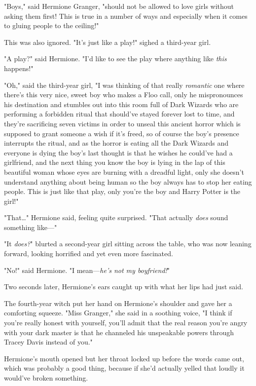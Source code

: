 "Boys," said Hermione Granger, "should not be allowed to love girls without
asking them first! This is true in a number of ways and especially when it
comes to gluing people to the ceiling!"

This was also ignored. "It's just like a play!" sighed a third-year girl.

"A play?" said Hermione. "I'd like to see the play where anything like
\emph{this} happens!"

"Oh," said the third-year girl, "I was thinking of that really \emph{romantic}
one where there's this very nice, sweet boy who makes a Floo call, only he
mispronounces his destination and stumbles out into this room full of Dark
Wizards who are performing a forbidden ritual that should've stayed forever
lost to time, and they're sacrificing seven victims in order to unseal this
ancient horror which is supposed to grant someone a wish if it's freed, so of
course the boy's presence interrupts the ritual, and as the horror is eating
all the Dark Wizards and everyone is dying the boy's last thought is that he
wishes he could've had a girlfriend, and the next thing you know the boy is
lying in the lap of this beautiful woman whose eyes are burning with a dreadful
light, only she doesn't understand anything about being human so the boy always
has to stop her eating people. This is just like that play, only you're the boy
and Harry Potter is the girl!"

"That{\ldots}" Hermione said, feeling quite surprised. "That actually
\emph{does} sound something like---"

"It \emph{does?}" blurted a second-year girl sitting across the table, who was
now leaning forward, looking horrified and yet even more fascinated.

"No!" said Hermione. "I mean---\emph{he's not my boyfriend!}"

Two seconds later, Hermione's ears caught up with what her lips had just said.

The fourth-year witch put her hand on Hermione's shoulder and gave her a
comforting squeeze. "Miss Granger," she said in a soothing voice, "I think if
you're really honest with yourself, you'll admit that the real reason you're
angry with your dark master is that he channeled his unspeakable powers through
Tracey Davis instead of you."

Hermione's mouth opened but her throat locked up before the words came out,
which was probably a good thing, because if she'd actually yelled that loudly
it would've broken something.

